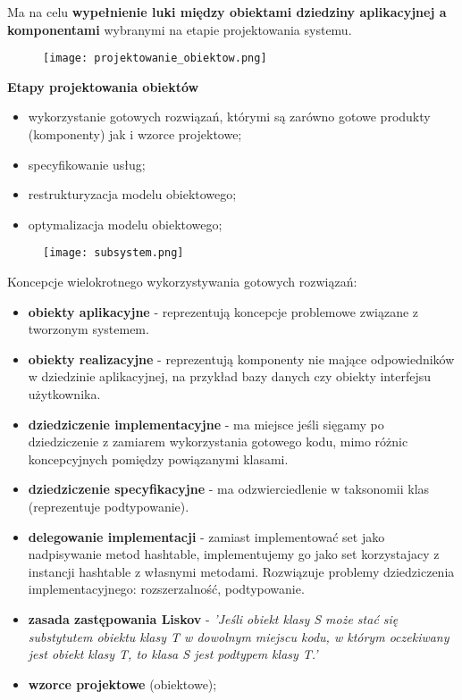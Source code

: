 \documentclass[../main.tex]{subfiles}
\begin{document}
    Ma na celu \textbf{wypełnienie luki między obiektami dziedziny aplikacyjnej a komponentami} wybranymi na etapie projektowania systemu.


    \begin{figure}[h]
        \texttt{[image: projektowanie\_obiektow.png]}
    \end{figure}

    \textbf{Etapy projektowania obiektów}
    \begin{itemize}
        \item wykorzystanie gotowych rozwiązań, którymi są zarówno
        gotowe produkty (komponenty) jak i wzorce projektowe;
        \item specyfikowanie usług;
        \item restrukturyzacja modelu obiektowego;
        \item optymalizacja modelu obiektowego;
    \end{itemize}

    \begin{figure}[H]
        \texttt{[image: subsystem.png]}
    \end{figure}

    Koncepcje wielokrotnego wykorzystywania gotowych rozwiązań:
    \begin{itemize}
        \item \textbf{obiekty aplikacyjne} - reprezentują koncepcje problemowe związane z tworzonym systemem.
        \item \textbf{obiekty realizacyjne} - reprezentują komponenty nie mające odpowiedników w
        dziedzinie aplikacyjnej, na przykład bazy danych czy obiekty interfejsu użytkownika.
        \item \textbf{dziedziczenie implementacyjne} - ma miejsce jeśli sięgamy po dziedziczenie z zamiarem wykorzystania
        gotowego kodu, mimo różnic koncepcyjnych pomiędzy powiązanymi klasami.
        \item \textbf{dziedziczenie specyfikacyjne} - ma odzwierciedlenie w taksonomii klas (reprezentuje podtypowanie).
        \item \textbf{delegowanie implementacji} - zamiast implementować set jako nadpisywanie metod hashtable, implementujemy go jako set korzystajacy z instancji hashtable z własnymi metodami.
        Rozwiązuje problemy dziedziczenia implementacyjnego: rozszerzalność, podtypowanie.
        \item \textbf{zasada zastępowania Liskov} - \textit{'Jeśli obiekt klasy S może stać się substytutem obiektu klasy T w
        dowolnym miejscu kodu, w którym oczekiwany jest obiekt klasy T, to klasa S jest podtypem klasy T.'}
        \item \textbf{wzorce projektowe} (obiektowe);
    \end{itemize}
\end{document}

